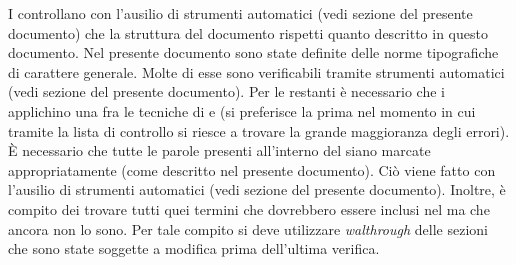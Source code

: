 						I  controllano con l'ausilio di strumenti automatici (vedi sezione  del presente documento) che la struttura del documento rispetti quanto descritto in questo documento.
						Nel presente documento sono state definite delle norme tipografiche di carattere generale. Molte di esse sono verificabili tramite strumenti automatici (vedi sezione  del presente documento). Per le restanti è necessario che i  applichino una fra le tecniche di  e \textit{}	(si preferisce la prima nel momento in cui tramite la lista di controllo si riesce a trovare la grande maggioranza degli errori).
						È necessario che tutte le parole presenti all'interno del  siano marcate appropriatamente (come descritto nel presente documento). Ciò viene fatto con l'ausilio di strumenti automatici (vedi sezione  del presente documento). Inoltre, è compito dei  trovare tutti quei termini che dovrebbero essere inclusi nel  ma che ancora non lo sono. Per tale compito si deve utilizzare \textit{walthrough} delle sezioni che sono state soggette a modifica prima dell'ultima verifica.

